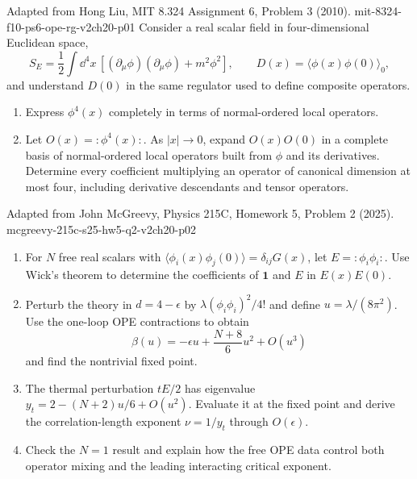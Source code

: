 
\begin{enumerate}
  {Adapted from Hong Liu, MIT 8.324 Assignment 6, Problem 3 (2010).}
  {mit-8324-f10-ps6-ope-rg-v2ch20-p01}
  Consider a real scalar field in four-dimensional Euclidean space,
  \[
    S_E=\frac12\int \dd^4x\,
      \left[(\partial_\mu\phi)(\partial_\mu\phi)+m^2\phi^2\right],
    \qquad
    D(x)=\langle\phi(x)\phi(0)\rangle_0,
  \]
  and understand \(D(0)\) in the same regulator used to define composite
  operators.
  \begin{enumerate}
    \item[(a)]
    Express \(\phi^4(x)\) completely in terms of normal-ordered local
    operators.
    \item[(b)]
    Let \(O(x)=:\!\phi^4(x)\!:\).  As \(|x|\to0\), expand
    \(O(x)O(0)\) in a complete basis of normal-ordered local operators
    built from \(\phi\) and its derivatives.  Determine every coefficient
    multiplying an operator of canonical dimension at most four, including
    derivative descendants and tensor operators.
  \end{enumerate}

  {Adapted from John McGreevy, Physics 215C, Homework 5, Problem 2 (2025).}
  {mcgreevy-215c-s25-hw5-q2-v2ch20-p02}
  \begin{enumerate}
    \item[(a)]
    For \(N\) free real scalars with
    \(\langle\phi_i(x)\phi_j(0)\rangle=\delta_{ij}G(x)\), let
    \(E=:\!\phi_i\phi_i\!:\).  Use Wick's theorem to determine the
    coefficients of \(\mathbf{1}\) and \(E\) in \(E(x)E(0)\).
    \item[(b)]
    Perturb the theory in \(d=4-\epsilon\) by
    \(\lambda(\phi_i\phi_i)^2/4!\) and define
    \(u=\lambda/(8\pi^2)\).  Use the one-loop OPE contractions to obtain
    \[
      \beta(u)=-\epsilon u+\frac{N+8}{6}u^2+O(u^3)
    \]
    and find the nontrivial fixed point.
    \item[(c)]
    The thermal perturbation \(tE/2\) has eigenvalue
    \(y_t=2-(N+2)u/6+O(u^2)\).  Evaluate it at the fixed point and derive
    the correlation-length exponent \(\nu=1/y_t\) through
    \(O(\epsilon)\).
    \item[(d)]
    Check the \(N=1\) result and explain how the free OPE data control both
    operator mixing and the leading interacting critical exponent.
  \end{enumerate}


\end{enumerate}

